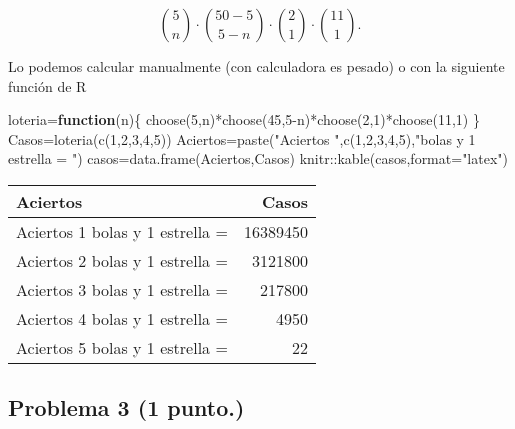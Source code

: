 \documentclass[
]{article}
\newenvironment{Shaded}{\begin{snugshade}}{\end{snugshade}}
\newcommand{\AttributeTok}[1]{\textcolor[rgb]{0.77,0.63,0.00}{#1}}
\newcommand{\ControlFlowTok}[1]{\textcolor[rgb]{0.13,0.29,0.53}{\textbf{#1}}}
\newcommand{\DecValTok}[1]{\textcolor[rgb]{0.00,0.00,0.81}{#1}}
\newcommand{\FunctionTok}[1]{\textcolor[rgb]{0.00,0.00,0.00}{#1}}
\newcommand{\NormalTok}[1]{#1}
\newcommand{\OtherTok}[1]{\textcolor[rgb]{0.56,0.35,0.01}{#1}}
\newcommand{\SpecialCharTok}[1]{\textcolor[rgb]{0.00,0.00,0.00}{#1}}
\newcommand{\StringTok}[1]{\textcolor[rgb]{0.31,0.60,0.02}{#1}}
\begin{document}
\[
\binom{5}{n}\cdot \binom{50-5}{5-n}\cdot \binom{2}{1}\cdot \binom{11}{1}.
\]

Lo podemos calcular manualmente (con calculadora es pesado) o con la
siguiente función de R

\begin{Shaded}
\begin{Highlighting}[]
\NormalTok{loteria}\OtherTok{=}\ControlFlowTok{function}\NormalTok{(n)\{}
\FunctionTok{choose}\NormalTok{(}\DecValTok{5}\NormalTok{,n)}\SpecialCharTok{*}\FunctionTok{choose}\NormalTok{(}\DecValTok{45}\NormalTok{,}\DecValTok{5}\SpecialCharTok{{-}}\NormalTok{n)}\SpecialCharTok{*}\FunctionTok{choose}\NormalTok{(}\DecValTok{2}\NormalTok{,}\DecValTok{1}\NormalTok{)}\SpecialCharTok{*}\FunctionTok{choose}\NormalTok{(}\DecValTok{11}\NormalTok{,}\DecValTok{1}\NormalTok{)}
\NormalTok{\}}
\NormalTok{Casos}\OtherTok{=}\FunctionTok{loteria}\NormalTok{(}\FunctionTok{c}\NormalTok{(}\DecValTok{1}\NormalTok{,}\DecValTok{2}\NormalTok{,}\DecValTok{3}\NormalTok{,}\DecValTok{4}\NormalTok{,}\DecValTok{5}\NormalTok{))}
\NormalTok{Aciertos}\OtherTok{=}\FunctionTok{paste}\NormalTok{(}\StringTok{"Aciertos "}\NormalTok{,}\FunctionTok{c}\NormalTok{(}\DecValTok{1}\NormalTok{,}\DecValTok{2}\NormalTok{,}\DecValTok{3}\NormalTok{,}\DecValTok{4}\NormalTok{,}\DecValTok{5}\NormalTok{),}\StringTok{"bolas y  1 estrella = "}\NormalTok{)}
\NormalTok{casos}\OtherTok{=}\FunctionTok{data.frame}\NormalTok{(Aciertos,Casos)}
\NormalTok{knitr}\SpecialCharTok{::}\FunctionTok{kable}\NormalTok{(casos,}\AttributeTok{format=}\StringTok{"latex"}\NormalTok{)}
\end{Highlighting}
\end{Shaded}

\begin{tabular}{l|r}
\hline
Aciertos & Casos\\
\hline
Aciertos  1 bolas y  1 estrella = & 16389450\\
\hline
Aciertos  2 bolas y  1 estrella = & 3121800\\
\hline
Aciertos  3 bolas y  1 estrella = & 217800\\
\hline
Aciertos  4 bolas y  1 estrella = & 4950\\
\hline
Aciertos  5 bolas y  1 estrella = & 22\\
\hline
\end{tabular}

\hypertarget{problema-3}{%
\subsection{\texorpdfstring{Problema 3
(\textbf{1 punto.})}{Problema 3 ()}}\label{problema-3}}
\end{document}
